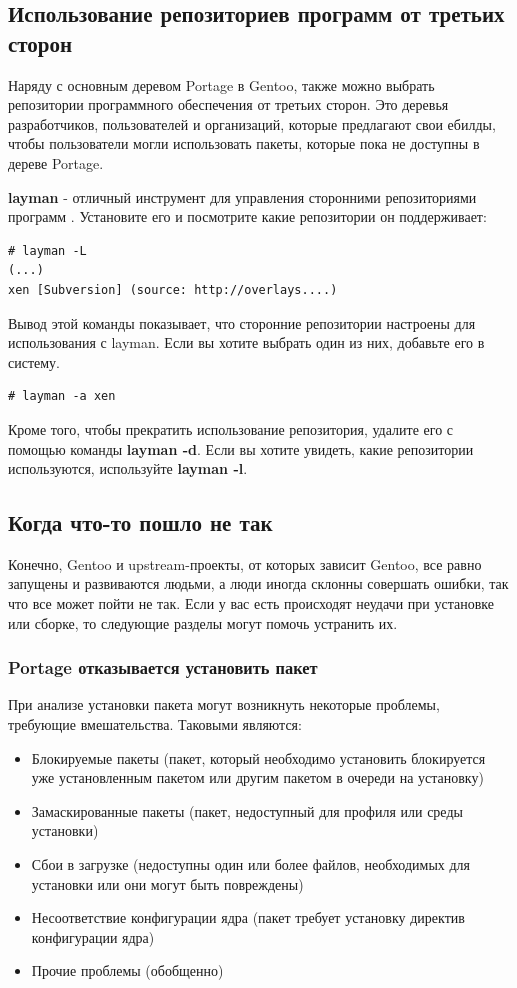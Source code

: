 \documentclass[10pt]{book}
\begin{document}
\subsection{Использование репозиториев программ от третьих сторон}
Наряду с основным деревом Portage в Gentoo, также можно выбрать репозитории программного обеспечения от третьих сторон. Это деревья разработчиков, пользователей и организаций, которые предлагают свои ебилды, чтобы пользователи могли использовать пакеты, которые пока не доступны в дереве Portage.

\textbf{layman} - отличный инструмент для управления сторонними репозиториями программ . Установите его и  посмотрите какие репозитории он  поддерживает:
 \begin{tcolorbox}
\begin{lstlisting}
# layman -L
(...)
xen [Subversion] (source: http://overlays....)
\end{lstlisting}
\end{tcolorbox}
Вывод этой команды показывает, что сторонние репозитории настроены для использования с layman. Если вы хотите выбрать один из них, добавьте его в систему.
 \begin{tcolorbox}
\begin{lstlisting}
# layman -a xen
\end{lstlisting}
\end{tcolorbox}
Кроме того, чтобы прекратить использование репозитория, удалите его с помощью команды \textbf{layman -d}. Если вы хотите увидеть, какие репозитории используются, используйте \textbf{layman -l}.

\subsection{Когда что-то пошло не так}
Конечно, Gentoo и upstream-проекты, от которых зависит Gentoo, все равно запущены и развиваются людьми, а люди  иногда склонны совершать ошибки, так что все может пойти не так. Если у вас есть происходят неудачи при установке или сборке, то следующие разделы могут помочь устранить их.

\subsubsection{Portage отказывается установить пакет}
При анализе установки пакета могут возникнуть некоторые проблемы, требующие вмешательства. Таковыми являются:
\begin{itemize}
 \item Блокируемые пакеты (пакет, который необходимо установить блокируется уже установленным пакетом или другим пакетом в очереди на установку)
 \item Замаскированные пакеты (пакет, недоступный для профиля или среды установки)
 \item Сбои в загрузке (недоступны один или более файлов, необходимых для установки или они могут быть повреждены)
 \item Несоответствие конфигурации ядра (пакет требует установку директив конфигурации ядра)
 \item Прочие проблемы (обобщенно)
\end{itemize}
\end{document}
